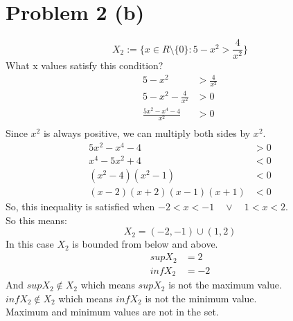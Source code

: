 \documentclass{article}
\begin{document}
\section*{Problem 2 (b)}
\[
   X_2 := \{x \in R \setminus \{0\}: 5 - x^2 > \frac{4}{x^2}\}
\]
What x values satisfy this condition? \\
\begin{align*}
   5 - x^2 &> \frac{4}{x^2} \\
   5 - x^2 - \frac{4}{x^2} &> 0 \\
   \frac{5x^2 - x^4 - 4}{x^2} &> 0 \\
\end{align*}
Since \(x^2\) is always positive, we can multiply both sides by \(x^2\).\\
\begin{align*}
   5x^2 - x^4 - 4 &> 0 \\
   x^4 - 5x^2 + 4 &< 0 \\
   (x^2 - 4)(x^2 - 1) &< 0 \\
   (x - 2)(x + 2)(x - 1)(x + 1) &< 0
\end{align*}
So, this inequality is satisfied when \(-2 < x < -1 \quad \lor \quad 1 < x < 2\).\\
So this means:
\[
   X_2 = (-2, -1) \cup (1, 2)
\]
In this case \(X_2\) is bounded from below and above.\\
\begin{align*}
   sup X_2 &= 2 \\
   inf X_2 &= -2
\end{align*}
And \(sup X_2 \notin X_2\) which means \(sup X_2\) is not the maximum value.\\
\(inf X_2 \notin X_2\) which means \(inf X_2\) is not the minimum value.\\
Maximum and minimum values are not in the set.\\
\end{document}

